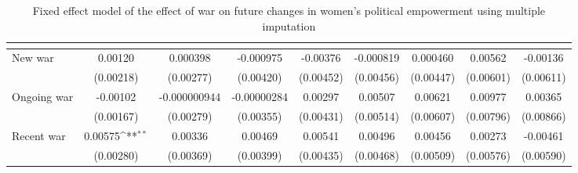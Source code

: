 \begin{table}[htbp]\centering
\def\sym#1{\ifmmode^{#1}\else\(^{#1}\)\fi}
\caption{Fixed effect model of the effect of war on future changes in women's political empowerment using multiple imputation\label{imputPoLem}}
\begin{tabular}{l*{8}{c}}
\hline\hline
                    &&&&&&&&\\
\hline
New war             &     0.00120         &    0.000398         &   -0.000975         &    -0.00376         &   -0.000819         &    0.000460         &     0.00562         &    -0.00136         \\
                    &   (0.00218)         &   (0.00277)         &   (0.00420)         &   (0.00452)         &   (0.00456)         &   (0.00447)         &   (0.00601)         &   (0.00611)         \\
[1em]
Ongoing war         &    -0.00102         &-0.000000944         & -0.00000284         &     0.00297         &     0.00507         &     0.00621         &     0.00977         &     0.00365         \\
                    &   (0.00167)         &   (0.00279)         &   (0.00355)         &   (0.00431)         &   (0.00514)         &   (0.00607)         &   (0.00796)         &   (0.00866)         \\
[1em]
Recent war          &     0.00575\sym{**} &     0.00336         &     0.00469         &     0.00541         &     0.00496         &     0.00456         &     0.00273         &    -0.00461         \\
                    &   (0.00280)         &   (0.00369)         &   (0.00399)         &   (0.00435)         &   (0.00468)         &   (0.00509)         &   (0.00576)         &   (0.00590)         \\

\end{tabular}
\end{table}
